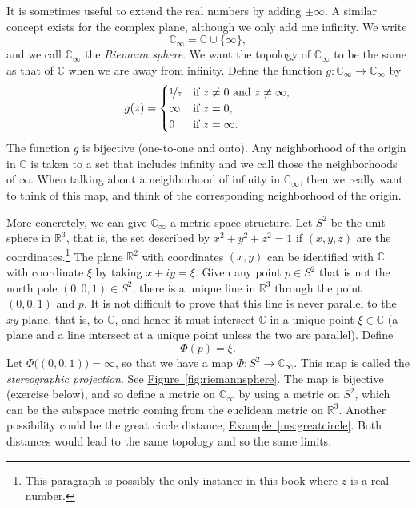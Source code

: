\documentclass[12pt,openany]{book}
\newcommand{\C}{{\mathbb{C}}}
\newcommand{\R}{{\mathbb{R}}}
\newcommand{\myindex}[1]{#1\index{#1}}
\theoremstyle{plain}
\theoremstyle{remark}
\theoremstyle{definition}
\theoremstyle{exercise}
\theoremstyle{example}
\newcommand{\figureref}[1]{\hyperref[#1]{Figure~\ref*{#1}}}
\newcommand{\exampleref}[1]{\hyperref[#1]{Example~\ref*{#1}}}
\begin{document}
It is sometimes useful to extend the real numbers by adding $\pm \infty$.
A similar concept exists for the complex plane, although
we only add one infinity.  We write
%
%
\begin{equation*}
\C_{\infty} = \C \cup \{ \infty \} ,
\end{equation*}
and we call $\C_{\infty}$ the \emph{\myindex{Riemann sphere}}.
We want the topology of $\C_\infty$ to be the same as that of $\C$
when we are away from infinity.
Define the function $g \colon \C_\infty \to \C_\infty$ by
\begin{equation*}
g(z) =
\begin{cases}
\nicefrac{1}{z} & \text{if } z \not= 0 \text{ and } z \not= \infty, \\
\infty & \text{if } z = 0, \\
0 & \text{if } z = \infty.
\end{cases}
\end{equation*}
The function $g$ is bijective (one-to-one and onto).
Any neighborhood of the origin in $\C$ is taken to a set that
includes infinity and we call those the neighborhoods of
$\infty$.  When talking about a neighborhood of
infinity in $\C_{\infty}$, then we really want to think of this map,
and think of the corresponding neighborhood of the origin.

More concretely, we can give $\C_{\infty}$ a metric space structure.
Let $S^2$ be the unit sphere in $\R^3$,
that is, the set described by $x^2 + y^2 + z^2 = 1$ if $(x,y,z)$ are the
coordinates.\footnote{This paragraph is possibly the only instance in this book where
$z$ is a real number.}  The plane $\R^2$ with coordinates $(x,y)$ can be
identified with $\C$ with coordinate $\xi$ by taking $x+iy = \xi$.
Given any point $p \in S^2$ that is not the north pole $(0,0,1) \in S^2$,
there is a unique line in $\R^3$ through the point $(0,0,1)$ and $p$.
It is not difficult to prove that this line is never parallel to the
$xy$-plane, that is, to $\C$, and hence it must intersect $\C$ in a unique
point $\xi \in \C$ (a plane and a line intersect at a unique point unless
the two are parallel).  Define
\begin{equation*}
\Phi(p) = \xi.
\end{equation*}
Let $\Phi\bigl((0,0,1)\bigr) = \infty$, so that we have a map
$\Phi \colon S^2 \to \C_\infty$.  This map is called the 
\emph{\myindex{stereographic projection}}.  See
\figureref{fig:riemannsphere}.
The map is bijective (exercise below),
and so define a metric on $\C_\infty$ by
using a metric on $S^2$, which can be the subspace
metric coming from the euclidean metric on $\R^3$.
Another possibility
could be the great circle distance, \exampleref{ms:greatcircle}.
Both distances would lead to the same topology and so the same limits.
\end{document}
